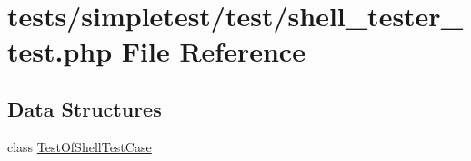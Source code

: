 \hypertarget{shell__tester__test_8php}{\section{tests/simpletest/test/shell\-\_\-tester\-\_\-test.php File Reference}
\label{shell__tester__test_8php}
}
\subsection*{Data Structures}
\begin{DoxyCompactItemize}
\item 
class \hyperlink{class_test_of_shell_test_case}{Test\-Of\-Shell\-Test\-Case}
\end{DoxyCompactItemize}
